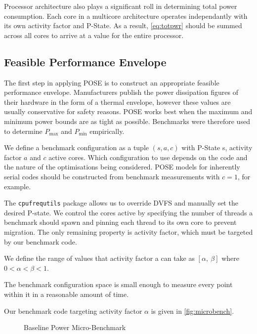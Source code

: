 Processor architecture also plays a significant roll in determining total power consumption.
Each core in a multicore architecture operates independantly with its own activity factor and P-State.
As a result, \autoref{eq:totpwr} should be summed across all cores to arrive at a value for the entire processor.

\subsection{Feasible Performance Envelope}
The first step in applying POSE is to construct an appropriate feasible performance envelope.
Manufacturers publish the power dissipation figures of their hardware in the form of a thermal envelope, however these values are usually conservative for safety reasons.
POSE works best when the maximum and minimum power bounds are as tight as possible.
Benchmarks were therefore used to determine $P_{\max}$ and $P_{\min}$ empirically.

We define a benchmark configuration as a tuple $(s,a,c)$ with P-State s, activity factor $a$ and $c$ active cores.
Which configuration to use depends on the code and the nature of the optimisations being considered.
POSE models for inherently serial codes should be constructed from benchmark measurements with $c = 1$, for example.

The \texttt{cpufrequtils} package allows us to override DVFS and manually set the desired P-state.
We control the cores active by specifying the number of threads a benchmark should spawn and pinning each thread to its own core to prevent migration.
The only remaining property is activity factor, which must be targeted by our benchmark code.

\clearpage

We  define the range of values that activity factor a can take as $[\alpha,~\beta]$ where $0 < \alpha < \beta < 1$.

The benchmark configuration space is small enough to measure every point within it in a reasonable amount of time.

Our benchmark code targeting activity factor $\alpha$ is given in \autoref{fig:microbench}.




\begin{figure}[ht]
\centering
\lstset{basicstyle=\ttfamily\footnotesize\bfseries, frame=tb} %

\caption{Baseline Power Micro-Benchmark}
\label{fig:microbench}
\end{figure}

